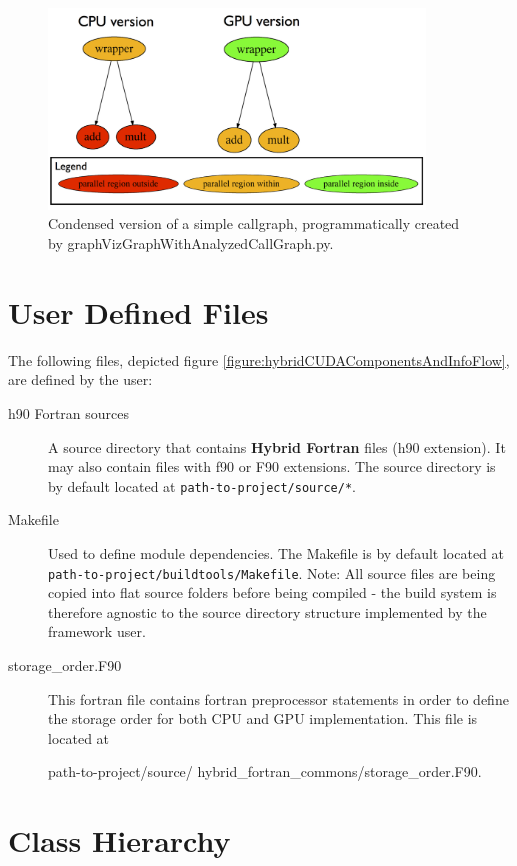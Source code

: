 \begin{figure}[htpb]
	\centering
	\includegraphics[width=10cm]{figures/callgraph}
	\caption[Callgraph Example]{Condensed version of a simple callgraph, programmatically created by graphVizGraphWithAnalyzedCallGraph.py.}
	\label{figure:callgraph}
\end{figure}

\section{User Defined Files} \label{sub:userDefinedFiles}

The following files, depicted figure \ref{figure:hybridCUDAComponentsAndInfoFlow}, are defined by the user:

\begin{description}
 \item[h90 Fortran sources] A source directory that contains \textbf{Hybrid Fortran} files (h90 extension). It may also contain files with f90 or F90 extensions. The source directory is by default located at \verb|path-to-project/source/*|.
 \item[Makefile] Used to define module dependencies. The Makefile is by default located at \verb|path-to-project/buildtools/Makefile|. Note: All source files are being copied into flat source folders before being compiled - the build system is therefore agnostic to the source directory structure implemented by the framework user.
 \item[storage\_order.F90] This fortran file contains fortran preprocessor statements in order to define the storage order for both CPU and GPU implementation. This file is located at
 \begin{verbatim*}path-to-project/source/
hybrid_fortran_commons/storage_order.F90.\end{verbatim*}

\end{description}

\section{Class Hierarchy} \label{sub:archHierarchy}

